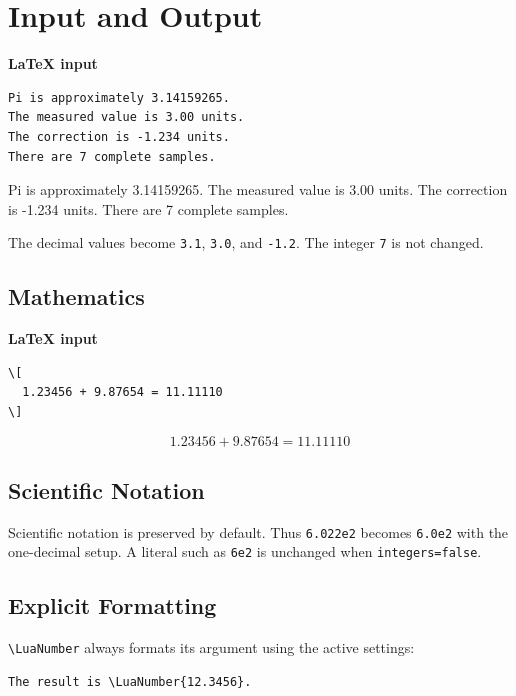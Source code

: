 \documentclass[11pt]{article}
\newcommand\InputHeading{\par\smallskip\noindent\textbf{LaTeX input}\par\smallskip}
\begin{document}
\section{Input and Output}

\InputHeading
\LuaNumbersOff
\begin{lstlisting}[style=latexinput]
Pi is approximately 3.14159265.
The measured value is 3.00 units.
The correction is -1.234 units.
There are 7 complete samples.
\end{lstlisting}
\LuaNumbersOn

\begin{processedoutput}
Pi is approximately 3.14159265.
The measured value is 3.00 units.
The correction is -1.234 units.
There are 7 complete samples.
\end{processedoutput}

The decimal values become \texttt{3.1}, \texttt{3.0}, and \texttt{-1.2}.
The integer \texttt{7} is not changed.

\subsection{Mathematics}

\InputHeading
\LuaNumbersOff
\begin{lstlisting}[style=latexinput]
\[
  1.23456 + 9.87654 = 11.11110
\]
\end{lstlisting}
\LuaNumbersOn

\begin{processedoutput}
\[
  1.23456 + 9.87654 = 11.11110
\]
\end{processedoutput}

\subsection{Scientific Notation}

Scientific notation is preserved by default. Thus \texttt{6.022e2} becomes
\texttt{6.0e2} with the one-decimal setup. A literal such as \texttt{6e2} is
unchanged when \texttt{integers=false}.

\subsection{Explicit Formatting}

\verb|\LuaNumber| always formats its argument using the active settings:

\begin{lstlisting}[style=latexinput]
The result is \LuaNumber{12.3456}.
\end{lstlisting}
\end{document}
